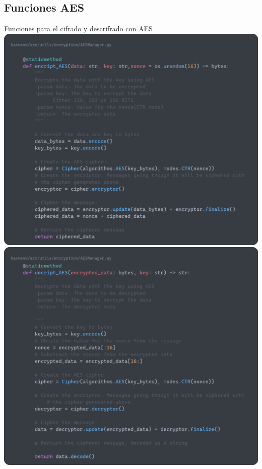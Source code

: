 \documentclass[a4paper,11pt]{article}
\begin{document}
\subsection{Funciones AES}
    \label{sec:funcionesAES}
    Funciones para el cifrado y descrifrado con AES
    \vspace{0.5cm}
    \includegraphics[width=\textwidth]{images/encript_AES.png}
    \includegraphics[width=\textwidth]{images/decript_AES.png} 
\end{document}
